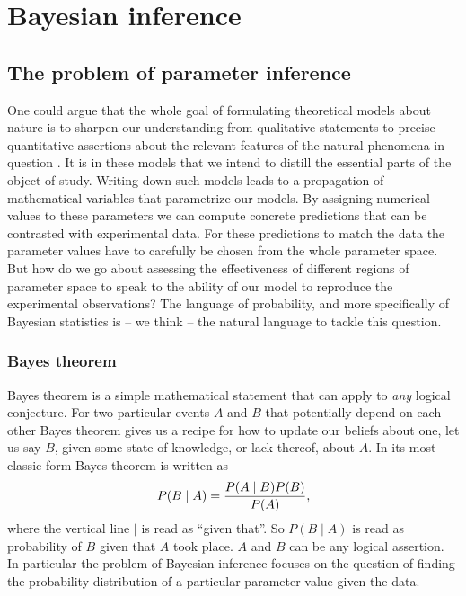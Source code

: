 \section{Bayesian inference}
\label{sec:bayesian}

\subsection{The problem of parameter inference}

One could argue that the whole goal of formulating theoretical models about
nature is to sharpen our understanding from qualitative statements to precise
quantitative assertions about the relevant features of the natural phenomena in
question \cite{Gunawardena2014}. It is in these models that we intend to distill
the essential parts of the object of study. Writing down such models leads to a
propagation of mathematical variables that parametrize our models. By assigning
numerical values to these parameters we can compute concrete predictions that
can be contrasted with experimental data. For these predictions to match the
data the parameter values have to carefully be chosen from the whole parameter
space. But how do we go about assessing the effectiveness of different regions
of parameter space to speak to the ability of our model to reproduce the
experimental observations? The language of probability, and more specifically of
Bayesian statistics is -- we think -- the natural language to tackle this
question.

\subsubsection{Bayes theorem}

Bayes theorem is a simple mathematical statement that can apply to \textit{any}
logical conjecture. For two particular events $A$ and $B$ that potentially 
depend on each other Bayes theorem gives us a recipe for how to update our 
beliefs about one, let us say $B$, given some state of knowledge, or lack thereof, about
$A$. In its most classic form Bayes theorem is written as
\begin{equation}
P(B \mid A) = {P(A \mid B) P(B) \over P(A)},
\end{equation}
where the vertical line $\mid$ is read as ``given that''. So $P(B \mid A)$ is
read as probability of $B$ given that $A$ took place. $A$ and $B$ can be any
logical assertion. In particular the problem of Bayesian inference focuses on
the question of finding the probability distribution of a particular parameter
value given the data.

